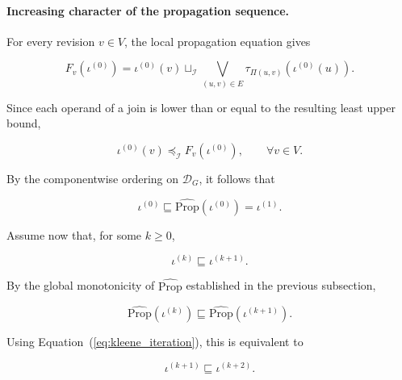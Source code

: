 \documentclass[10pt]{article}
\begin{document}
	\paragraph{Increasing character of the propagation sequence.}
	
	For every revision $v\in V$, the local propagation equation gives
	
	\begin{equation}
		F_v\!\left(\iota^{(0)}\right)
		=
		\iota^{(0)}(v)
		\sqcup_{\mathcal I}
		\bigvee_{(u,v)\in E}
		\tau_{\Pi(u,v)}
		\!\left(
		\iota^{(0)}(u)
		\right).
		\label{eq:initial_local_expansion}
	\end{equation}
	
	Since each operand of a join is lower than or equal to the resulting least
	upper bound,
	
	\begin{equation}
		\iota^{(0)}(v)
		\preceq_{\mathcal I}
		F_v\!\left(\iota^{(0)}\right),
		\qquad
		\forall v\in V.
		\label{eq:initial_component_growth}
	\end{equation}
	
	By the componentwise ordering on $\mathcal D_G$, it follows that
	
	\begin{equation}
		\iota^{(0)}
		\sqsubseteq
		\widehat{\mathrm{Prop}}
		\!\left(
		\iota^{(0)}
		\right)
		=
		\iota^{(1)}.
		\label{eq:initial_iteration_growth}
	\end{equation}
	
	Assume now that, for some $k\geq 0$,
	
	\begin{equation}
		\iota^{(k)}
		\sqsubseteq
		\iota^{(k+1)}.
		\label{eq:iteration_induction_hypothesis}
	\end{equation}
	
	By the global monotonicity of $\widehat{\mathrm{Prop}}$ established in the
	previous subsection,
	
	\begin{equation}
		\widehat{\mathrm{Prop}}
		\!\left(
		\iota^{(k)}
		\right)
		\sqsubseteq
		\widehat{\mathrm{Prop}}
		\!\left(
		\iota^{(k+1)}
		\right).
		\label{eq:iteration_monotone_step}
	\end{equation}
	
	Using Equation~(\ref{eq:kleene_iteration}), this is equivalent to
	
	\begin{equation}
		\iota^{(k+1)}
		\sqsubseteq
		\iota^{(k+2)}.
		\label{eq:iteration_induction_step}
	\end{equation}
	
\end{document}
